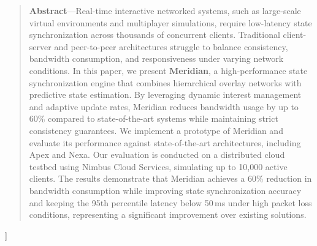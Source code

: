 \documentclass[10pt,twocolumn]{article}
\begin{document}
  \begin{quote}
    \small
    \textbf{\color{primary}Abstract}---Real-time interactive networked systems, such as large-scale virtual environments and multiplayer simulations, require low-latency state synchronization across thousands of concurrent clients. Traditional client-server and peer-to-peer architectures struggle to balance consistency, bandwidth consumption, and responsiveness under varying network conditions. In this paper, we present \textbf{Meridian}, a high-performance state synchronization engine that combines hierarchical overlay networks with predictive state estimation. By leveraging dynamic interest management and adaptive update rates, Meridian reduces bandwidth usage by up to 60\% compared to state-of-the-art systems while maintaining strict consistency guarantees. We implement a prototype of Meridian and evaluate its performance against state-of-the-art architectures, including Apex and Nexa. Our evaluation is conducted on a distributed cloud testbed using Nimbus Cloud Services, simulating up to 10,000 active clients. The results demonstrate that Meridian achieves a 60\% reduction in bandwidth consumption while improving state synchronization accuracy and keeping the 95th percentile latency below 50\,ms under high packet loss conditions, representing a significant improvement over existing solutions.
  \end{quote}
  \vspace{1.5em}
]








\end{document}
